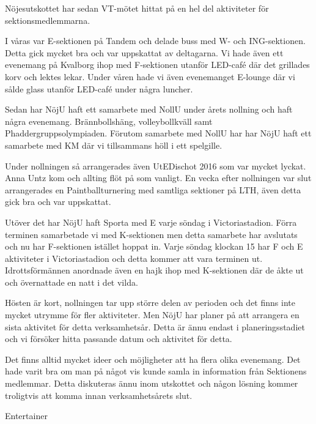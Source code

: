 \documentclass[../_main/handlingar.tex]{subfiles}
\begin{document}

Nöjesutskottet har sedan VT-mötet hittat på en hel del aktiviteter för sektionsmedlemmarna.

I våras var E-sektionen på Tandem och delade buss med W- och ING-sektionen. Detta gick mycket bra och var uppskattat av deltagarna. Vi hade även ett evenemang på Kvalborg ihop med F-sektionen utanför LED-café där det grillades korv och lektes lekar. Under våren hade vi även evenemanget E-lounge där vi sålde glass utanför LED-café under några luncher.

Sedan har NöjU haft ett samarbete med NollU under årets nollning och haft några evenemang. Brännbollshäng, volleybollkväll samt Phaddergruppsolympiaden. Förutom samarbete med NollU har har NöjU haft ett samarbete med KM där vi tillsammans höll i ett spelgille.

Under nollningen så arrangerades även UtEDischot 2016 som var mycket lyckat. Anna Untz kom och allting flöt på som vanligt. En vecka efter nollningen var slut arrangerades en Paintballturnering med samtliga sektioner på LTH, även detta gick bra och var uppskattat.

Utöver det har NöjU haft Sporta med E varje söndag i Victoriastadion. Förra terminen samarbetade vi med K-sektionen men detta samarbete har avslutats och nu har F-sektionen istället hoppat in. Varje söndag klockan 15 har F och E aktiviteter i Victoriastadion och detta kommer att vara terminen ut. Idrottsförmännen anordnade även en hajk ihop med K-sektionen där de åkte ut och övernattade en natt i det vilda.

Hösten är kort, nollningen tar upp större delen av perioden och det finns inte mycket utrymme för fler aktiviteter. Men NöjU har planer på att arrangera en sista aktivitet för detta verksamhetsår. Detta är ännu endast i planeringsstadiet och vi försöker hitta passande datum och aktivitet för detta.

Det finns alltid mycket ideer och möjligheter att ha flera olika evenemang. Det hade varit bra om man på något vis kunde samla in information från Sektionens medlemmar. Detta diskuteras ännu inom utskottet och någon lösning kommer troligtvis att komma innan verksamhetsårets slut.

\begin{signatures}{1}
    \mvh
    \signature{Dalia Khairallah}{Entertainer}
\end{signatures}
\end{document}
